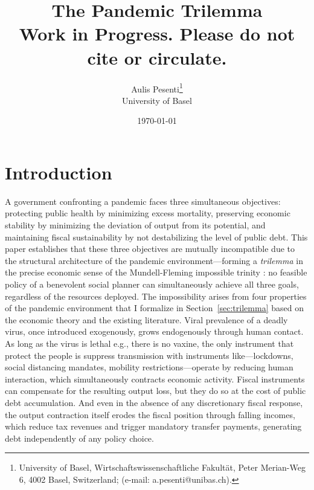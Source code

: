 \documentclass[12pt, a4paper]{article}
\title{\textbf{The Pandemic Trilemma} \\[1em] 
\large Work in Progress. Please do not cite or circulate.}
\author{Aulis Pesenti\setcounter{footnote}{1}\thanks{University of Basel, Wirtschaftswissenschaftliche Fakultät, Peter Merian-Weg 6, 4002 Basel, Switzerland; (e-mail: a.pesenti@unibas.ch).} \\ University of Basel}
\date{\today}
\begin{document}
\maketitle

\begin{abstract}

\end{abstract}

\section{Introduction}

A government confronting a pandemic faces three simultaneous objectives: protecting public health by minimizing excess mortality, preserving economic stability by minimizing the deviation of output from its potential, and maintaining fiscal sustainability by not destabilizing the level of public debt. This paper establishes that these three objectives are mutually incompatible due to the structural architecture of the pandemic environment---forming a \textit{trilemma} in the precise economic sense of the Mundell-Fleming impossible trinity \citet{mundell1963}: no feasible policy of a benevolent social planner can simultaneously achieve all three goals, regardless of the resources deployed.
The impossibility arises from four properties of the pandemic environment that I formalize in Section~\ref{sec:trilemma} based on the economic theory and the existing literature. Viral prevalence of a deadly virus, once introduced exogenously, grows endogenously through human contact. As long as the virus is lethal e.g., there is no vaxine, the only instrument that protect the people is suppress transmission with instruments like---lockdowns, social distancing mandates, mobility restrictions---operate by reducing human interaction, which simultaneously contracts economic activity. Fiscal instruments can compensate for the resulting output loss, but they do so at the cost of public debt accumulation. And even in the absence of any discretionary fiscal response, the output contraction itself erodes the fiscal position through falling incomes, which reduce tax revenues and trigger mandatory transfer payments, generating debt independently of any policy choice.
\end{document}

